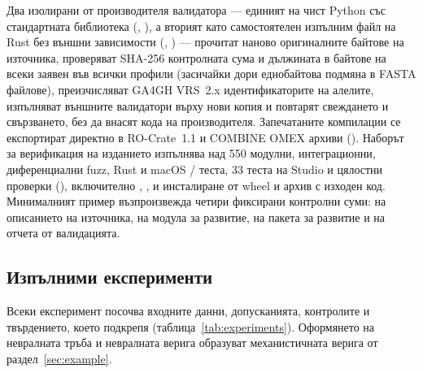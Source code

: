 \documentclass[10.5pt,a4paper]{article}
\begin{document}
Два изолирани от производителя валидатора — единият на чист Python със стандартната библиотека (, ), а вторият като самостоятелен изпълним файл на Rust без външни зависимости (, ) — прочитат наново оригиналните байтове на източника, проверяват SHA-256 контролната сума и дължината в байтове на всеки заявен  във всички профили (засичайки дори еднобайтова подмяна в FASTA файлове), преизчисляват GA4GH VRS~2.x идентификаторите на алелите, изпълняват външните валидатори върху нови копия и повтарят свеждането и свързването, без да внасят кода на производителя. Запечатаните компилации се експортират директно в RO-Crate~1.1 и COMBINE OMEX архиви (). Наборът за верификация на изданието изпълнява над 550 модулни, интеграционни, диференциални fuzz, Rust и macOS / теста, 33 теста на Studio и цялостни проверки (), включително , ,  и инсталиране от wheel и архив с изходен код. Минималният пример възпроизвежда четири фиксирани контролни суми: на описанието на източника, на модула за развитие, на пакета за развитие и на отчета от валидацията.

\subsection{Изпълними експерименти}\label{sec:experiments}

Всеки експеримент посочва входните данни, допусканията, контролите и твърдението, което подкрепя (таблица~\ref{tab:experiments}). Оформянето на невралната тръба и невралната верига образуват механистичната верига от раздел~\ref{sec:example}.
\end{document}
